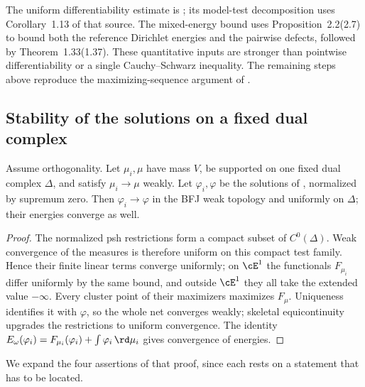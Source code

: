 \begin{remark}
\label{rem:ch28-stability-quoted}
The uniform differentiability estimate is
\cite[Proposition~2.18, equation~(2.19)]{BJ25FiniteEnergy}; its model-test
decomposition uses Corollary~1.13 of that source.
The mixed-energy bound uses Proposition~2.2(2.7) to bound both the
reference Dirichlet energies and the pairwise defects, followed by
Theorem~1.33(1.37).  These quantitative inputs are stronger than
pointwise differentiability or a single Cauchy--Schwarz inequality.
The remaining steps above reproduce the maximizing-sequence argument of
\cite[Theorem~2.22]{BJ25FiniteEnergy}.
\end{remark}

\subsection{Stability of the solutions on a fixed dual complex}
\label{sec:ch28-fixed-skeleton}

\begin{proposition}
\label{prop:fixed-skeleton-stability}
Assume orthogonality.  Let $\mu_i,\mu$ have mass $V$, be supported on one fixed dual complex
$\Delta$, and satisfy $\mu_i\to\mu$ weakly.  Let $\varphi_i,\varphi$
be the solutions of , normalized by
supremum zero.  Then $\varphi_i\to\varphi$ in the BFJ weak topology and
uniformly on $\Delta$; their energies converge as well.
\end{proposition}

\begin{proof}
The normalized psh restrictions form a compact subset of $C^0(\Delta)$.
Weak convergence of the measures is therefore uniform on this compact test
family.  Hence their finite linear terms converge uniformly; on
$\cE^1$ the functionals $F_{\mu_i}$ differ uniformly by the same bound,
and outside $\cE^1$ they all take the extended value $-\infty$.  Every cluster point of their maximizers maximizes
$F_\mu$.  Uniqueness identifies it with $\varphi$, so the whole net
converges weakly; skeletal equicontinuity upgrades the restrictions to
uniform convergence.  The identity
$E_\omega(\varphi_i)=F_{\mu_i}(\varphi_i)+
\int\varphi_i\,\rd \mu_i$ gives convergence of energies.
\end{proof}

We expand the four assertions of that proof, since each rests on a statement
that has to be located.

